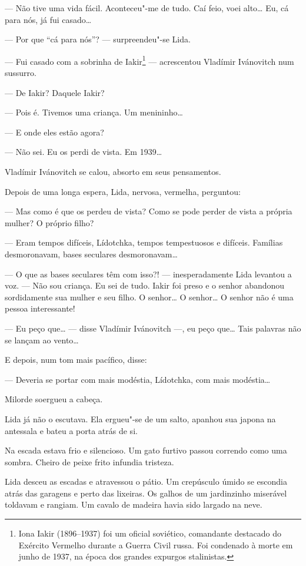 --- Não tive uma vida fácil. Aconteceu"-me de tudo. Caí feio, voei
alto\ldots{} Eu, cá para nós, já fui casado\ldots{}

--- Por que ``cá para nós''? --- surpreendeu"-se Lida.

--- Fui casado com a sobrinha de Iakir\footnote{Iona Iakir (1896--1937)
  foi um oficial soviético, comandante destacado do Exército Vermelho
  durante a Guerra Civil russa. Foi condenado à morte em junho de 1937,
  na época dos grandes expurgos stalinistas.} --- acrescentou Vladímir
Ivánovitch num sussurro.

--- De Iakir? Daquele Iakir?

--- Pois é. Tivemos uma criança. Um menininho\ldots{}

--- E onde eles estão agora?

--- Não sei. Eu os perdi de vista. Em 1939\ldots{}

Vladímir Ivánovitch se calou, absorto em seus pensamentos.

Depois de uma longa espera, Lida, nervosa, vermelha, perguntou:

--- Mas como é que os perdeu de vista? Como se pode perder de vista a
própria mulher? O próprio filho?

--- Eram tempos difíceis, Lídotchka, tempos tempestuosos e difíceis.
Famílias desmoronavam, bases seculares desmoronavam\ldots{}

--- O que as bases seculares têm com isso?! --- inesperadamente Lida
levantou a voz. --- Não sou criança. Eu sei de tudo. Iakir foi preso e o
senhor abandonou sordidamente sua mulher e seu filho. O senhor\ldots{} O
senhor\ldots{} O senhor não é uma pessoa interessante!

--- Eu peço que\ldots{} --- disse Vladímir Ivánovitch ---, eu peço que\ldots{}
Tais palavras não se lançam ao vento\ldots{}

E depois, num tom mais pacífico, disse:

--- Deveria se portar com mais modéstia, Lídotchka, com mais modéstia\ldots{}

Milorde soergueu a cabeça.

Lida já não o escutava. Ela ergueu"-se de um salto, apanhou sua japona na
antessala e bateu a porta atrás de si.

Na escada estava frio e silencioso. Um gato furtivo passou correndo como
uma sombra. Cheiro de peixe frito infundia tristeza.

Lida desceu as escadas e atravessou o pátio. Um crepúsculo úmido se
escondia atrás das garagens e perto das lixeiras. Os galhos de um
jardinzinho miserável toldavam e rangiam. Um cavalo de madeira havia
sido largado na neve.


